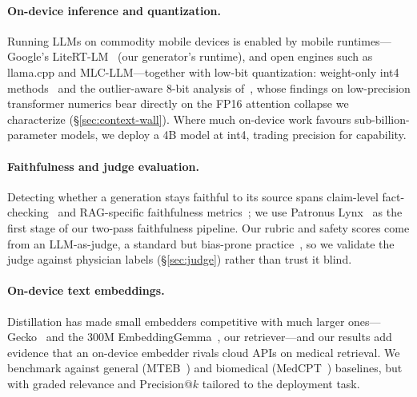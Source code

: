 \paragraph{On-device inference and quantization.} Running LLMs on commodity
mobile devices is enabled by mobile runtimes---Google's LiteRT-LM~\cite{litertlm2025}
(our generator's runtime), and open engines such as llama.cpp and
MLC-LLM---together with low-bit quantization: weight-only int4
methods~\cite{lin2024awq} and the outlier-aware 8-bit analysis
of~\citet{dettmers2022llmint8}, whose findings on low-precision transformer
numerics bear directly on the FP16 attention collapse we characterize
(\S\ref{sec:context-wall}). Where much on-device work favours sub-billion-%
parameter models, we deploy a 4B model at int4, trading precision for capability.

\paragraph{Faithfulness and judge evaluation.} Detecting whether a generation
stays faithful to its source spans claim-level fact-checking~\cite{tang2024minicheck}
and RAG-specific faithfulness metrics~\cite{es2024ragas}; we use Patronus
Lynx~\cite{ravi2024lynx} as the first stage of our two-pass faithfulness
pipeline. Our rubric and safety scores come from an LLM-as-judge, a standard but
bias-prone practice~\cite{zheng2023judging}, so we validate the judge against
physician labels (\S\ref{sec:judge}) rather than trust it blind.

\paragraph{On-device text embeddings.} Distillation has made small embedders
competitive with much larger ones---Gecko~\cite{lee2024gecko} and the 300M
EmbeddingGemma~\cite{schechtervera2025embeddinggemma}, our retriever---and our
results add evidence that an on-device embedder rivals cloud APIs on medical
retrieval. We benchmark against general (MTEB~\cite{muennighoff2023mteb}) and
biomedical (MedCPT~\cite{jin2023medcpt}) baselines, but with graded relevance and
Precision@$k$ tailored to the deployment task.
